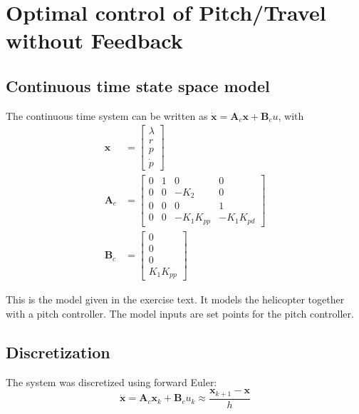 
\section{Optimal control of Pitch/Travel without Feedback}
\subsection{Continuous time state space model}
The continuous time system can be written as $\mathbf{\dot{x}} = \mathbf{A}_c\mathbf{x}+ \mathbf{B}_c{u}$, with
\begin{subequations}
    \begin{align}
        \mathbf{x} &= \begin{bmatrix}
            \lambda\\
            r\\
            p\\
            \dot{p}
        \end{bmatrix}\\
        \mathbf{A}_c &= \begin{bmatrix}
            0 & 1 & 0 & 0\\
            0 & 0 & -K_2 & 0\\
            0 & 0 & 0 & 1\\
            0 & 0& -K_1K_{pp} & -K_1K_{pd}
        \end{bmatrix} \\
        \mathbf{B}_c &= \begin{bmatrix}
            0\\
            0\\
            0\\
            K_1K_{pp}
        \end{bmatrix}
    \end{align}
\end{subequations}

This is the model given in the exercise text. It models the helicopter together with a pitch controller. The model inputs are set points for the pitch controller.

\subsection{Discretization}
The system was discretized using forward Euler:
\begin{equation}
    \mathbf{\dot{x}} = \mathbf{A}_c\mathbf{x}_k + \mathbf{B}_c{u}_k \approx \frac{\mathbf{x}_{k+1}-\mathbf{x}}{h}
\end{equation}


